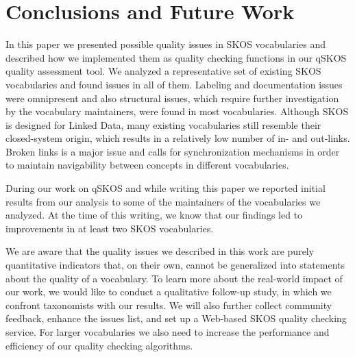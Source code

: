 \section{Conclusions and Future Work}\label{sec:conclusions}

In this paper we presented possible quality issues in SKOS vocabularies and described how we implemented them as quality checking functions in our qSKOS quality assessment tool. We analyzed a representative set of existing SKOS vocabularies and found  issues in all of them. Labeling and documentation issues were omnipresent and also structural issues, which require further investigation by the vocabulary maintainers, were found in most vocabularies. Although SKOS is designed for Linked Data, many existing vocabularies still resemble their closed-system origin, which results in a relatively low number of in- and out-links. Broken links is a major issue and calls for synchronization mechanisms in order to maintain navigability between concepts in different vocabularies.

During our work on qSKOS and while writing this paper we reported initial results from our analysis to some of the maintainers of the vocabularies we analyzed. At the time of this writing, we know that our findings led to improvements in at least two SKOS vocabularies.

We are aware that the quality issues we described in this work are purely quantitative indicators that, on their own, cannot be generalized into statements about the quality of a vocabulary. To learn more about the real-world impact of our work, we would like to conduct a qualitative follow-up study, in which we confront taxonomists with our results. We will also further collect community feedback, enhance the issues list, and set up a Web-based SKOS quality checking service. For larger vocabularies we also need to increase the performance and efficiency of our quality checking algorithms.